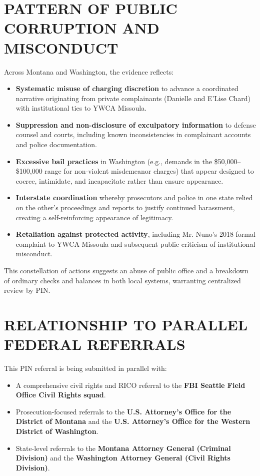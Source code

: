 \documentclass[12pt,oneside]{article}
\begin{document}
\begin{flushleft}
\section*{PATTERN OF PUBLIC CORRUPTION AND MISCONDUCT}

Across Montana and Washington, the evidence reflects:

\begin{itemize}
\item \textbf{Systematic misuse of charging discretion} to advance a coordinated narrative originating from private complainants (Danielle and E'Lise Chard) with institutional ties to YWCA Missoula.
\item \textbf{Suppression and non-disclosure of exculpatory information} to defense counsel and courts, including known inconsistencies in complainant accounts and police documentation.
\item \textbf{Excessive bail practices} in Washington (e.g., demands in the \$50,000--\$100,000 range for non-violent misdemeanor charges) that appear designed to coerce, intimidate, and incapacitate rather than ensure appearance.
\item \textbf{Interstate coordination} whereby prosecutors and police in one state relied on the other's proceedings and reports to justify continued harassment, creating a self-reinforcing appearance of legitimacy.
\item \textbf{Retaliation against protected activity}, including Mr. Nuno's 2018 formal complaint to YWCA Missoula and subsequent public criticism of institutional misconduct.
\end{itemize}

This constellation of actions suggests an abuse of public office and a breakdown of ordinary checks and balances in both local systems, warranting centralized review by PIN.

\section*{RELATIONSHIP TO PARALLEL FEDERAL REFERRALS}

This PIN referral is being submitted in parallel with:

\begin{itemize}
\item A comprehensive civil rights and RICO referral to the \textbf{FBI Seattle Field Office Civil Rights squad}.
\item Prosecution-focused referrals to the \textbf{U.S. Attorney's Office for the District of Montana} and the \textbf{U.S. Attorney's Office for the Western District of Washington}.
\item State-level referrals to the \textbf{Montana Attorney General (Criminal Division)} and the \textbf{Washington Attorney General (Civil Rights Division)}.
\end{itemize}


\end{flushleft}
\end{document}
